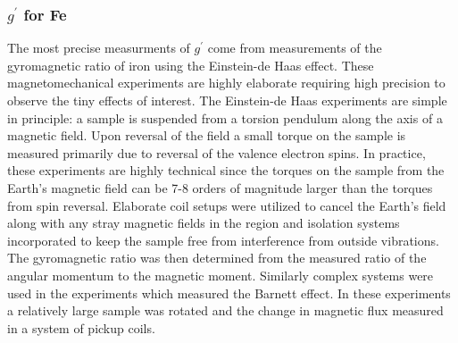 \documentclass[preprint,12pt]{elsarticle}
\begin{document}
\subsubsection{$g^{\prime}$ for Fe}
The most precise measurments of $g^{\prime}$ come from measurements of the gyromagnetic ratio of iron using the Einstein-de Haas effect. These magnetomechanical experiments are highly elaborate requiring high precision to observe the tiny effects of interest. The Einstein-de Haas experiments are simple in principle: a sample is suspended from a torsion pendulum along the axis of a magnetic field. Upon reversal of the field a small torque on the sample is measured primarily due to reversal of the valence electron spins. In practice, these experiments are highly technical since the torques on the sample from the Earth's magnetic field can be 7-8 orders of magnitude larger than the torques from spin reversal\cite{Scott1962}. Elaborate coil setups were utilized to cancel the Earth's field along with any stray magnetic fields in the region and isolation systems incorporated to keep the sample free from interference from outside vibrations. The gyromagnetic ratio was then determined from the measured ratio of the angular momentum to the magnetic moment. Similarly complex systems were used in the experiments which measured the Barnett effect. In these experiments a relatively large sample was rotated and the change in magnetic flux measured in a system of pickup coils. 
\end{document}
